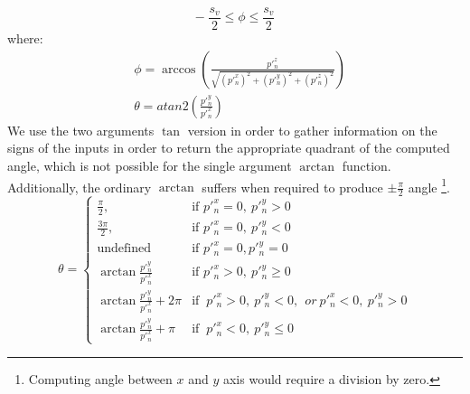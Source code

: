 \begin{equation}
\label{eq:fov3}
- \; \frac{s_v}{2} \leq \phi \leq \frac{s_v}{2}
\end{equation}
where: 
\begin{align*}
&\phi = \arccos
\left(\frac{p'^z_n}{\sqrt{(p'^x_n)^2 + (p'^y_n)^2 + (p'^z_n)^2}}\right) \\
&\theta = atan2 \left(\frac{p'^y_n}{p'^x_n} \right) 
\end{align*}
We use the  two arguments $\tan$ version in order to gather information on the signs of the inputs in order to return the appropriate quadrant of the computed angle, which is not possible for the single argument $\arctan$ function. Additionally, the ordinary $\arctan$  suffers when required to produce  $\pm \frac{\pi}{2} $ angle \footnote{Computing angle between $x$ and $y$ axis would require a division by zero.}.
\begin{equation*}
\theta = 
\begin{cases}

\frac{\pi}{2},&\mbox{if }  p'^x_n=0, \ p'^y_n>0  \\

\frac{3\pi}{2},&\mbox{if } p'^x_n=0, \ p'^y_n<0 \\

\text{undefined} &\mbox{if } p'^x_n=0, p'^y_n =0 \\

\arctan \frac{p'^y_n}{p'^x_n} &\mbox{if } p'^x_n>0, \ p'^y_n \ge 0  \\

\arctan \frac{p'^y_n}{p'^x_n} + 2 \pi &\mbox{if } \ p'^x_n>0, \ p'^y_n < 0, \ \ or
\ p'^x_n<0, \ p'^y_n > 0 \\

\arctan \frac{p'^y_n}{p'^x_n} + \pi &\mbox{if }\ p'^x_n<0, \ p'^y_n \le 0 
\end{cases}
\end{equation*}


